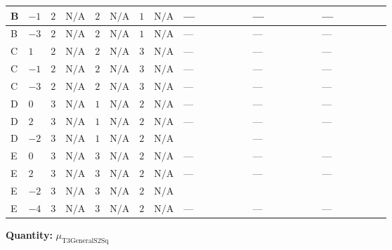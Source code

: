 \documentclass[8pt]{article}
\begin{document}
\begin{landscape}
\begin{longtable}{@{}llcccccc >{\raggedright\arraybackslash}p{0.21\linewidth} >{\raggedright\arraybackslash}p{0.21\linewidth} >{\raggedright\arraybackslash}p{0.21\linewidth}@{}}
\midrule
B & $-1$ & $2$ & $\text{N/A}$ & $2$ & $\text{N/A}$ & $1$ & $\text{N/A}$ & --- & --- & --- \\
\midrule
B & $-3$ & $2$ & $\text{N/A}$ & $2$ & $\text{N/A}$ & $1$ & $\text{N/A}$ & --- & --- & --- \\
\midrule
C & $1$ & $2$ & $\text{N/A}$ & $2$ & $\text{N/A}$ & $3$ & $\text{N/A}$ & --- & --- & --- \\
\midrule
C & $-1$ & $2$ & $\text{N/A}$ & $2$ & $\text{N/A}$ & $3$ & $\text{N/A}$ & --- & --- & --- \\
\midrule
C & $-3$ & $2$ & $\text{N/A}$ & $2$ & $\text{N/A}$ & $3$ & $\text{N/A}$ & --- & --- & --- \\
\midrule
D & $0$ & $3$ & $\text{N/A}$ & $1$ & $\text{N/A}$ & $2$ & $\text{N/A}$ & --- & --- & --- \\
\midrule
D & $2$ & $3$ & $\text{N/A}$ & $1$ & $\text{N/A}$ & $2$ & $\text{N/A}$ & --- & --- & --- \\
\midrule
D & $-2$ & $3$ & $\text{N/A}$ & $1$ & $\text{N/A}$ & $2$ & $\text{N/A}$ & \scriptsize\adjustbox{max width=\linewidth}{$\begin{gathered} 24 {\lambda_{X_{1}}} \left({\mu_{\mathrm{T3GeneralS2Sq}}}\right)^{*}\end{gathered}$} & --- & \scriptsize\adjustbox{max width=\linewidth}{$\begin{gathered} +2 {\lambda_{S_2}^{(1)}} {\mu_{\mathrm{T3GeneralS2Sq}}}\end{gathered}$} \\
\midrule
E & $0$ & $3$ & $\text{N/A}$ & $3$ & $\text{N/A}$ & $2$ & $\text{N/A}$ & --- & --- & --- \\
\midrule
E & $2$ & $3$ & $\text{N/A}$ & $3$ & $\text{N/A}$ & $2$ & $\text{N/A}$ & --- & --- & --- \\
\midrule
E & $-2$ & $3$ & $\text{N/A}$ & $3$ & $\text{N/A}$ & $2$ & $\text{N/A}$ & \scriptsize\adjustbox{max width=\linewidth}{$\begin{gathered} 40 {\lambda_{X_{1}}} \left({\mu_{\mathrm{T3GeneralS2Sq}}}\right)^{*}\end{gathered}$} & \scriptsize\adjustbox{max width=\linewidth}{$\begin{gathered} -12 {g_2}^2 {\mu_{\mathrm{T3GeneralS2Sq}}}\end{gathered}$} & \scriptsize\adjustbox{max width=\linewidth}{$\begin{gathered} +2 {\lambda_{S_2}^{(1)}} {\mu_{\mathrm{T3GeneralS2Sq}}}\end{gathered}$} \\
\midrule
E & $-4$ & $3$ & $\text{N/A}$ & $3$ & $\text{N/A}$ & $2$ & $\text{N/A}$ & --- & --- & --- \\
\midrule
\bottomrule
\end{longtable}
\clearpage
\noindent\textbf{Quantity: }${\mu_{\mathrm{T3GeneralS2Sq}}}$\par\smallskip

\end{landscape}
\end{document}
